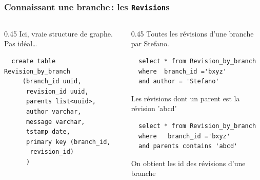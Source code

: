 	
\begin{frame}[fragile] \frametitle{Connaissant une branche\,: les \texttt{Revision}s}


\begin{columns}
    \begin{column}{0.45\textwidth}
  Ici, vraie structure de graphe. Pas idéal\ldots
    
  \begin{verbatim}
  create table Revision_by_branch
     (branch_id uuid, 
      revision_id uuid,
      parents list<uuid>,
      author varchar,
      message varchar,
      tstamp date, 
      primary key (branch_id, 
       revision_id)
      )
  \end{verbatim}
  
  
   \end{column}
 \begin{column}{0.45\textwidth}
   Toutes les révisions d'une branche par Stefano.
  
  \begin{verbatim}
  select * from Revision_by_branch 
  where  branch_id ='bxyz'
  and author = 'Stefano'
  \end{verbatim}
  
   \vfill
    Les révisions dont un parent est la révision 'abcd'
   
 \begin{verbatim}
  select * from Revision_by_branch 
  where   branch_id ='bxyz'
  and parents contains 'abcd'
  \end{verbatim}

\vfill 
  On obtient les id des révisions d'une branche
  
\end{column}
\end{columns}
	
\end{frame}
	

